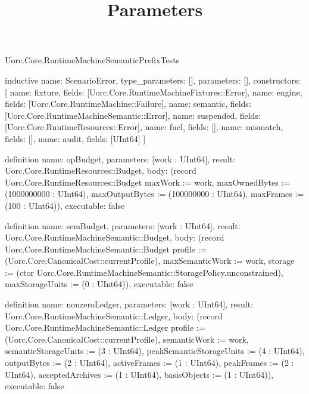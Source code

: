 \begin{lexlean}{Uorc.Core.RuntimeMachineSemanticPrefixTests}
\title{Parameters}
\begin{semanticmodule}
inductive{
  name: ScenarioError,
  type_parameters: [],
  parameters: [],
  constructors: [
    {name: fixture, fields: [Uorc.Core.RuntimeMachineFixtures::Error]},
    {name: engine, fields: [Uorc.Core.RuntimeMachine::Failure]},
    {name: semantic, fields: [Uorc.Core.RuntimeMachineSemantic::Error]},
    {name: suspended, fields: [Uorc.Core.RuntimeResources::Error]},
    {name: fuel, fields: []},
    {name: mismatch, fields: []},
    {name: audit, fields: [UInt64]}
  ]
}

definition{
  name: opBudget,
  parameters: [work : UInt64],
  result: Uorc.Core.RuntimeResources::Budget,
  body: (record Uorc.Core.RuntimeResources::Budget {maxWork := work, maxOwnedBytes := (1000000000 : UInt64), maxOutputBytes := (100000000 : UInt64), maxFrames := (100 : UInt64)}),
  executable: false
}

definition{
  name: semBudget,
  parameters: [work : UInt64],
  result: Uorc.Core.RuntimeMachineSemantic::Budget,
  body: (record Uorc.Core.RuntimeMachineSemantic::Budget {profile := (Uorc.Core.CanonicalCost::currentProfile), maxSemanticWork := work, storage := (ctor Uorc.Core.RuntimeMachineSemantic::StoragePolicy.unconstrained), maxStorageUnits := (0 : UInt64)}),
  executable: false
}

definition{
  name: nonzeroLedger,
  parameters: [work : UInt64],
  result: Uorc.Core.RuntimeMachineSemantic::Ledger,
  body: (record Uorc.Core.RuntimeMachineSemantic::Ledger {profile := (Uorc.Core.CanonicalCost::currentProfile), semanticWork := work, semanticStorageUnits := (3 : UInt64), peakSemanticStorageUnits := (4 : UInt64), outputBytes := (2 : UInt64), activeFrames := (1 : UInt64), peakFrames := (2 : UInt64), acceptedArchives := (1 : UInt64), basisObjects := (1 : UInt64)}),
  executable: false
}


\end{semanticmodule}
\end{lexlean}
